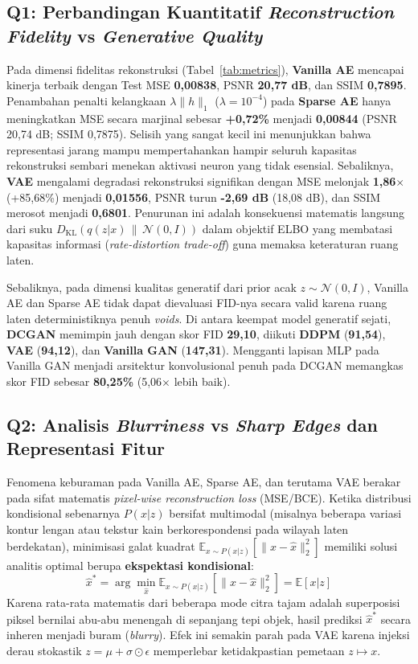 \documentclass[11pt,a4paper]{article}
\begin{document}
\subsection{Q1: Perbandingan Kuantitatif \textit{Reconstruction Fidelity} vs \textit{Generative Quality}}
Pada dimensi fidelitas rekonstruksi (Tabel~\ref{tab:metrics}), \textbf{Vanilla AE} mencapai kinerja terbaik dengan Test MSE \textbf{0,00838}, PSNR \textbf{20,77 dB}, dan SSIM \textbf{0,7895}. Penambahan penalti kelangkaan $\lambda \|h\|_1$ ($\lambda = 10^{-4}$) pada \textbf{Sparse AE} hanya meningkatkan MSE secara marjinal sebesar \textbf{+0,72\%} menjadi \textbf{0,00844} (PSNR 20,74 dB; SSIM 0,7875). Selisih yang sangat kecil ini menunjukkan bahwa representasi jarang mampu mempertahankan hampir seluruh kapasitas rekonstruksi sembari menekan aktivasi neuron yang tidak esensial. Sebaliknya, \textbf{VAE} mengalami degradasi rekonstruksi signifikan dengan MSE melonjak \textbf{1,86$\times$} (+85,68\%) menjadi \textbf{0,01556}, PSNR turun \textbf{-2,69 dB} (18,08 dB), dan SSIM merosot menjadi \textbf{0,6801}. Penurunan ini adalah konsekuensi matematis langsung dari suku $D_{\text{KL}}(q(z|x)\,\|\,\mathcal{N}(0,I))$ dalam objektif ELBO yang membatasi kapasitas informasi (\textit{rate-distortion trade-off}) guna memaksa keteraturan ruang laten.

Sebaliknya, pada dimensi kualitas generatif dari prior acak $z \sim \mathcal{N}(0, I)$, Vanilla AE dan Sparse AE tidak dapat dievaluasi FID-nya secara valid karena ruang laten deterministiknya penuh \textit{voids}. Di antara keempat model generatif sejati, \textbf{DCGAN} memimpin jauh dengan skor FID \textbf{29,10}, diikuti \textbf{DDPM} (\textbf{91,54}), \textbf{VAE} (\textbf{94,12}), dan \textbf{Vanilla GAN} (\textbf{147,31}). Mengganti lapisan MLP pada Vanilla GAN menjadi arsitektur konvolusional penuh pada DCGAN memangkas skor FID sebesar \textbf{80,25\%} (5,06$\times$ lebih baik).

\subsection{Q2: Analisis \textit{Blurriness} vs \textit{Sharp Edges} dan Representasi Fitur}
Fenomena keburaman pada Vanilla AE, Sparse AE, dan terutama VAE berakar pada sifat matematis \textit{pixel-wise reconstruction loss} (MSE/BCE). Ketika distribusi kondisional sebenarnya $P(x|z)$ bersifat multimodal (misalnya beberapa variasi kontur lengan atau tekstur kain berkorespondensi pada wilayah laten berdekatan), minimisasi galat kuadrat $\mathbb{E}_{x \sim P(x|z)}[\|x - \hat{x}\|_2^2]$ memiliki solusi analitis optimal berupa \textbf{ekspektasi kondisional}:
\begin{equation}
  \hat{x}^* = \arg\min_{\hat{x}} \mathbb{E}_{x \sim P(x|z)}\left[\|x - \hat{x}\|_2^2\right] = \mathbb{E}[x|z]
\end{equation}
Karena rata-rata matematis dari beberapa mode citra tajam adalah superposisi piksel bernilai abu-abu menengah di sepanjang tepi objek, hasil prediksi $\hat{x}^*$ secara inheren menjadi buram (\textit{blurry}). Efek ini semakin parah pada VAE karena injeksi derau stokastik $z = \mu + \sigma \odot \epsilon$ memperlebar ketidakpastian pemetaan $z \mapsto x$.
\end{document}
